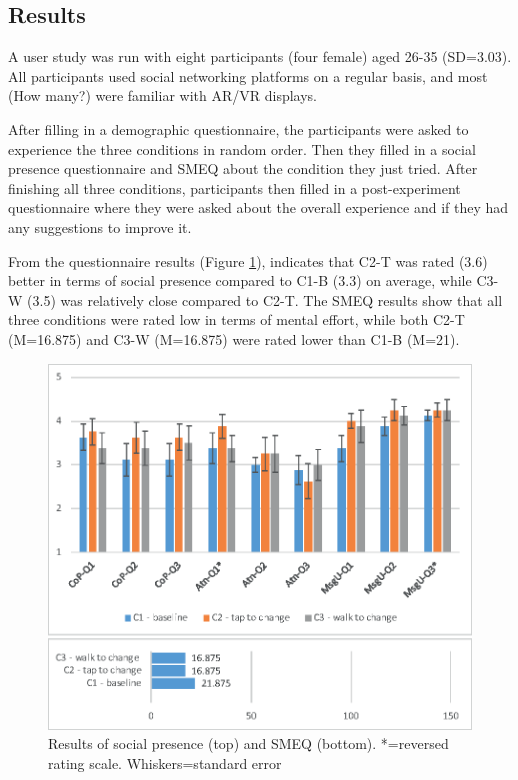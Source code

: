 \subsection{Results}

A user study was run with eight participants (four female) aged 26-35 (SD=3.03). All participants used social networking platforms on a regular basis, and most (How many?) were familiar with AR/VR displays. 

After filling in a demographic questionnaire, the participants were asked to experience the three conditions in random order. Then they filled in a social presence questionnaire and SMEQ about the condition they just tried. After finishing all three conditions, participants then filled in a post-experiment questionnaire where they were asked about the overall experience and if they had any suggestions to improve it. 

From the questionnaire results (Figure \ref{fig:data:results}), indicates that C2-T was rated (3.6) better in terms of social presence compared to C1-B (3.3) on average, while C3-W (3.5) was relatively close compared to C2-T. The SMEQ results show that all three conditions were rated low in terms of mental effort, while both C2-T (M=16.875) and C3-W (M=16.875) were rated lower than C1-B (M=21).

\begin{figure}[h]
  \centering
  \includegraphics[width=\columnwidth]{images/chi/images-01.eps}
  \caption{Results of social presence (top) and SMEQ (bottom). *=reversed rating scale. Whiskers=standard error}
  \label{fig:data:results}
\end{figure}

